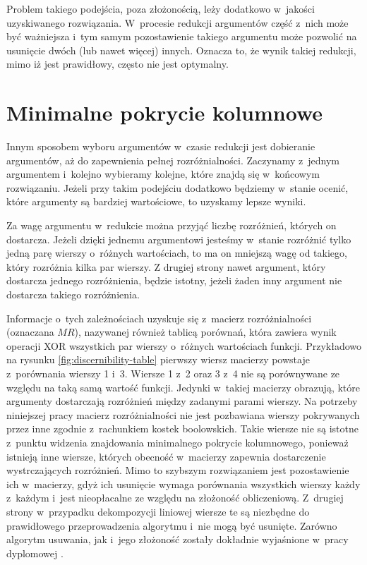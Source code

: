 Problem takiego podejścia,
poza złożonością,
leży dodatkowo w~jakości uzyskiwanego rozwiązania.
W~procesie redukcji argumentów część z~nich może być ważniejsza
i~tym samym pozostawienie takiego argumentu może pozwolić na usunięcie dwóch (lub nawet więcej) innych.
Oznacza to,
że wynik takiej redukcji,
mimo iż jest prawidłowy,
często nie jest optymalny.

\section{Minimalne pokrycie kolumnowe}

Innym sposobem wyboru argumentów w~czasie redukcji jest dobieranie argumentów,
aż do zapewnienia pełnej rozróżnialności.
Zaczynamy z~jednym argumentem i~kolejno wybieramy kolejne,
które znajdą się w~końcowym rozwiązaniu.
Jeżeli przy takim podejściu dodatkowo będziemy w~stanie ocenić,
które argumenty są bardziej wartościowe,
to uzyskamy lepsze wyniki.

Za wagę argumentu w~redukcie można przyjąć liczbę rozróżnień,
których on dostarcza.
Jeżeli dzięki jednemu argumentowi jesteśmy w~stanie rozróżnić tylko jedną parę wierszy o~różnych wartościach,
to ma on mniejszą wagę od takiego,
który rozróżnia kilka par wierszy.
Z drugiej strony nawet argument,
który dostarcza jednego rozróżnienia,
będzie istotny,
jeżeli żaden inny argument nie dostarcza takiego rozróżnienia.

Informacje o~tych zależnościach uzyskuje się z~macierz rozróżnialności (oznaczana $MR$), nazywanej również tablicą porównań,
która zawiera wynik operacji XOR wszystkich par wierszy o~różnych wartościach funkcji.
Przykładowo na rysunku \ref{fig:discernibility-table} pierwszy wiersz macierzy powstaje z~porównania wierszy 1 i~3.
Wiersze 1 z~2 oraz 3 z~4 nie są porównywane ze względu na taką samą wartość funkcji.
Jedynki w~takiej macierzy obrazują,
które argumenty dostarczają rozróżnień między zadanymi parami wierszy.
Na potrzeby niniejszej pracy macierz rozróżnialności nie jest pozbawiana wierszy pokrywanych przez inne zgodnie z~rachunkiem kostek boolowskich.
Takie wiersze nie są istotne z~punktu widzenia znajdowania minimalnego pokrycie kolumnowego,
ponieważ istnieją inne wiersze, których obecność w~macierzy zapewnia dostarczenie wystrczających rozróżnień.
Mimo to szybszym rozwiązaniem jest pozostawienie ich w~macierzy,
gdyż ich usunięcie wymaga porównania wszystkich wierszy każdy z~każdym
i~jest nieopłacalne ze względu na złożoność obliczeniową.
Z~drugiej strony w~przypadku dekompozycji liniowej wiersze te są niezbędne do prawidłowego przeprowadzenia algorytmu i~nie mogą być usunięte.
Zarówno algorytm usuwania,
jak i~jego złożoność zostały dokładnie wyjaśnione w~pracy dyplomowej \cite{inzynierka}.

